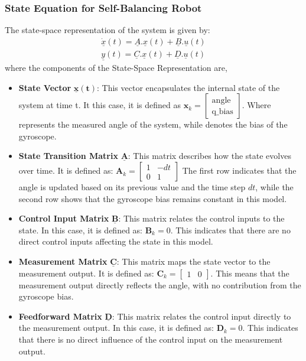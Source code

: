 \subsubsection{State Equation for Self-Balancing Robot}
The state-space representation of the system is given by:
$$
\begin{aligned}
	\underline{\dot{x}}(t) = \underline{A}.\underline{x}(t) + \underline{B}.\underline{u}(t) \\
	\underline{y}(t) = \underline{C}.\underline{x}(t) + \underline{D}.\underline{u}(t)
\end{aligned}
$$
where the components of the State-Space Representation are,
\begin{itemize}
	\item \textbf{State Vector} $\mathbf{\underline{x}(t)}$: This vector encapsulates the internal state of the system at time t. It this case, it is defined as $\mathbf{x}_{k} = \begin{bmatrix} \text{angle} \\ \text{q\_bias} \end{bmatrix}$. Where  represents the measured angle of the system, while  denotes the bias of the gyroscope.
	
	\item \textbf{State Transition Matrix} $\underline{\mathbf{A}}$: This matrix describes how the state evolves over time. It is defined as: $\mathbf{A}_k = \begin{bmatrix} 1 & -dt \\ 0 & 1 \end{bmatrix}$ The first row indicates that the angle is updated based on its previous value and the time step $dt$, while the second row shows that the gyroscope bias remains constant in this model.
	
	\item \textbf{Control Input Matrix} $\underline{\mathbf{B}}$: This matrix relates the control inputs to the state. In this case, it is defined as:
	$\mathbf{B}_k = 0$. This indicates that there are no direct control inputs affecting the state in this model.
	
	\item \textbf{Measurement Matrix} $\underline{\mathbf{C}}$: This matrix maps the state vector to the measurement output. It is defined as: $\mathbf{C}_k = \begin{bmatrix} 1 & 0 \end{bmatrix}$. This means that the measurement output directly reflects the angle, with no contribution from the gyroscope bias.
	
	\item \textbf{Feedforward Matrix} $\underline{\mathbf{D}}$: This matrix relates the control input directly to the measurement output. In this case, it is defined as: $\mathbf{D}_k = 0$. This indicates that there is no direct influence of the control input on the measurement output.	
\end{itemize}


